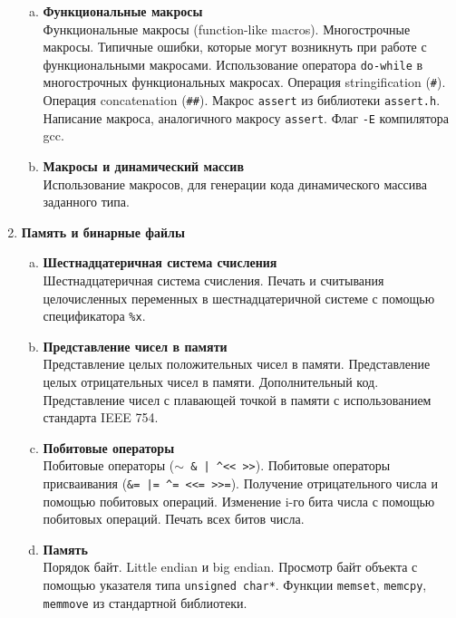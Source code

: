 \documentclass{article}
\begin{document}
\begin{enumerate}
\begin{enumerate}[a.]
\item \textbf{Функциональные макросы}\\
Функциональные макросы (function-like macros). Многострочные макросы. Типичные ошибки, которые могут возникнуть при работе с функциональными макросами. Использование оператора \texttt{do-while} в многострочных функциональных макросах. Операция stringification (\texttt{\#}). Операция concatenation (\texttt{\#\#}). Макрос \texttt{assert} из библиотеки \texttt{assert.h}. Написание макроса, аналогичного макросу \texttt{assert}. Флаг \texttt{-E} компилятора gcc.

\item \textbf{Макросы и динамический массив}\\
Использование макросов, для генерации кода динамического массива заданного типа.
\end{enumerate}


\item \textbf{Память и бинарные файлы}

\begin{enumerate}[a.]
\item \textbf{Шестнадцатеричная система счисления}\\
Шестнадцатеричная система счисления. Печать и считывания целочисленных переменных в шестнадцатеричной системе с помощью спецификатора \texttt{\%x}.

\item \textbf{Представление чисел в памяти}\\
Представление целых положительных чисел в памяти. Представление целых отрицательных чисел в памяти. Дополнительный код. Представление чисел с плавающей точкой в памяти с использованием стандарта IEEE 754.

\item \textbf{Побитовые операторы}\\
Побитовые операторы (\texttt{$\sim$  \&  |  \textasciicircum \quad <{}<  >{}>}). Побитовые операторы присваивания (\texttt{\&=  |=  \textasciicircum= \quad <{}<=  >{}>=}). Получение отрицательного числа и помощью побитовых операций. Изменение i-го бита числа с помощью побитовых операций. Печать всех битов числа.

\item \textbf{Память}\\
Порядок байт. Little endian и big endian. Просмотр байт объекта с помощью указателя типа \texttt{unsigned char*}. Функции \texttt{memset}, \texttt{memcpy}, \texttt{memmove} из стандартной библиотеки.


\end{enumerate}
\end{enumerate}
\end{document}
